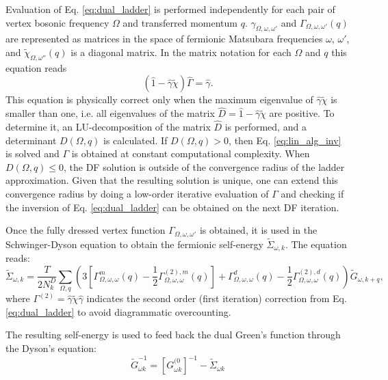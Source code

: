 \documentclass[3p,times,procedia]{elsarticle}
\begin{document}
Evaluation of Eq. \ref{eq:dual_ladder} is performed independently for each pair of vertex bosonic frequency $\Omega$ and transferred momentum $q$. 
$\gamma_{\Omega,\omega,\omega'}$ and $\Gamma_{\Omega,\omega,\omega'}(q)$ are represented as matrices in the space of fermionic Matsubara frequencies $\omega$, $\omega'$, and $\tilde\chi_{\Omega,\omega''}(q)$ is a diagonal matrix. 
In the matrix notation for each $\Omega$ and $q$ this equation reads 
\begin{equation}\label{eq:lin_alg_inv}
(\hat 1 - \hat \gamma \tilde \chi)\hat \Gamma  = \hat \gamma.
\end{equation} 
This equation is physically correct only when the maximum eigenvalue of $\hat \gamma \tilde \chi$ is smaller than one, i.e. all eigenvalues of the matrix $\hat D = \hat 1 - \hat \gamma \tilde \chi$ are positive. 
To determine it, an LU-decomposition of the matrix $\hat D$ is performed, and a determinant $D(\Omega, q)$ is calculated.
If $D(\Omega, q) > 0$, then Eq. \ref{eq:lin_alg_inv} is solved and $\Gamma$ is obtained at constant computational complexity.
When $D(\Omega, q) \leq 0$, the DF solution is outside of the convergence radius of the ladder approximation.
Given that the resulting solution is unique, one can extend this convergence radius by doing a low-order iterative evaluation of $\Gamma$ and checking if the inversion of Eq. \ref{eq:dual_ladder} can be obtained on the next DF iteration. 
 
Once the fully dressed vertex function $\Gamma_{\Omega,\omega,\omega'}$ is obtained, it is used in the Schwinger-Dyson equation to obtain the fermionic self-energy $\tilde \Sigma_{\omega, k}$. 
The equation reads:
\begin{equation}\label{eq:sd}
\tilde \Sigma_{\omega, k} = \frac{T}{2 N_k^D}  \sum_{\Omega, q} \left( 3 \left[\Gamma^m_{\Omega,\omega,\omega}(q) - \frac{1}{2}\Gamma^{(2), m}_{\Omega,\omega,\omega}(q) \right] + \Gamma^d_{\Omega,\omega,\omega}(q) - \frac{1}{2}\Gamma^{(2), d}_{\Omega,\omega,\omega}(q)  \right) \tilde G_{\omega, k + q},
\end{equation}
where $\Gamma^{(2)} = \hat \gamma \tilde \chi \hat \gamma $ indicates the second order (first iteration) correction from Eq. \ref{eq:dual_ladder} to avoid diagrammatic overcounting. 

The resulting self-energy is used to feed back the dual Green's function through the Dyson's equation:
\begin{equation}\label{eq:dyson}
\tilde G^{-1}_{\omega k} = \left[G^{(0}_{\omega k}\right]^{-1} - \tilde \Sigma_{\omega k}
\end{equation}
\end{document}
